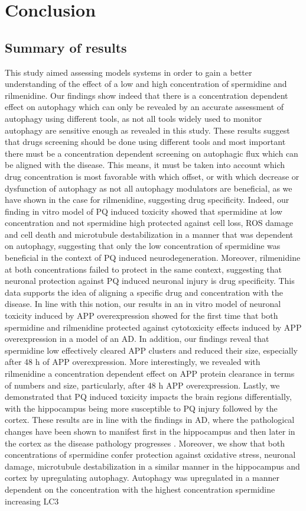 \chapter{Conclusion}
\section{Summary of results}
This study aimed assessing models systems in order to gain a better understanding of the effect of a low and high concentration of spermidine and rilmenidine.
 Our findings show indeed that  there is a concentration dependent effect on autophagy which can only be revealed by an accurate assessment of autophagy using different tools, as not all tools widely used to monitor autophagy are sensitive enough as revealed in this study. These results suggest that drugs screening should be done using different tools and most important there must be a concentration dependent screening on autophagic flux which can be aligned with the disease. This means, it must be taken into account which drug concentration is most favorable with which offset, or with which decrease or dysfunction of autophagy as not all autophagy modulators are beneficial, as we have shown in the case for rilmenidine, suggesting drug specificity. Indeed, our finding in vitro model of PQ induced toxicity showed that spermidine at low concentration and not spermidine high protected against cell loss, ROS damage and cell death and microtubule destabilization in a manner that was dependent on autophagy, suggesting that only the low concentration of spermidine was beneficial in the context of PQ induced neurodegeneration. Moreover, rilmenidine at both concentrations failed to protect in the same context, suggesting that neuronal protection against PQ induced neuronal injury is drug specificity. This data supports the idea of aligning a specific drug and concentration with the disease. In line with this notion, our results in an in vitro model of neuronal toxicity induced by APP overexpression showed for the first time that both spermidine and rilmenidine protected against cytotoxicity effects induced by APP overexpression in a model of an AD. In addition, our findings reveal that spermidine low effectively cleared APP clusters and reduced their size, especially after 48 h of APP overexpression. More interestingly, we revealed with rilmenidine a concentration dependent effect on APP protein clearance in terms of numbers and size, particularly, after 48 h APP overexpression. Lastly, we demonstrated that PQ induced toxicity impacts the brain regions differentially, with the hippocampus being more susceptible to PQ injury followed by the cortex. These results are in line with the findings in AD, where the pathological changes have been shown to manifest first in the hippocampus and then later in the cortex as the disease pathology progresses \citep{Braak2004,Braak1998,Braak1991,Braak2012}. Moreover, we show that both concentrations of spermidine confer protection against oxidative stress, neuronal damage, microtubule destabilization in a similar manner in the hippocampus and cortex by upregulating autophagy. Autophagy was upregulated in a manner dependent on the concentration with the highest concentration spermidine increasing LC3 